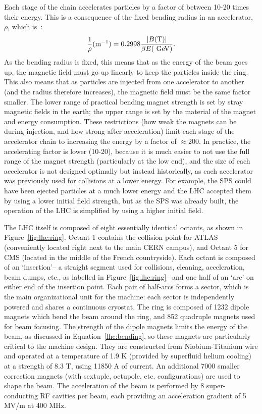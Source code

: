 Each stage of the chain accelerates particles by a factor of between 10-20 times their energy. This is a consequence of the fixed bending radius in an accelerator, $\rho$, which is~\cite{accelerator-book}:
%
\begin{equation}
\label{lhc:bending}
\frac{1}{\rho} (\mathrm{m}^{-1}) = 0.2998 \frac{|B (\mathrm{T})|}{\beta E (\GeV)}.
\end{equation}
%
As the bending radius is fixed, this means that as the energy of the beam goes up, the magnetic field must go up linearly to keep the particles inside the ring. This also means that as particles are injected from one accelerator to another (and the radius therefore increases), the magnetic field must be the same factor smaller. The lower range of practical bending magnet strength is set by stray magnetic fields in the earth; the upper range is set by the material of the magnet and energy consumption. These restrictions (how weak the magnets can be during injection, and how strong after acceleration) limit each stage of the accelerator chain to increasing the energy by a factor of $\approx$200. In practice, the accelerating factor is lower (10-20), because it is much easier to not use the full range of the magnet strength (particularly at the low end), and the size of each accelerator is not designed optimally but instead historically, as each accelerator was previously used for collisions at a lower energy. For example, the SPS could have been ejected particles at a much lower energy and the LHC accepted them by using a lower initial field strength, but as the SPS was already built, the operation of the LHC is simplified by using a higher initial field. 


The LHC itself is composed of eight essentially identical octants, as shown in Figure~\ref{fig:lhc:ring}. Octant 1 contains the collision point for ATLAS (conveniently located right next to the main CERN campus), and Octant 5 for CMS (located in the middle of the French countryside). Each octant is composed of an `insertion'-- a straight segment used for collisions, cleaning, acceleration, beam dumps, etc., as labelled in Figure~\ref{fig:lhc:ring}-- and one half of an `arc' on either end of the insertion point. Each pair of half-arcs forms a sector, which is the main organizational unit for the machine: each sector is independently powered and shares a continuous cryostat. The ring is composed of 1232 dipole magnets which bend the beam around the ring, and 852 quadruple magnets used for beam focusing. The strength of the dipole magnets limits the energy of the beam, as discussed in Equation~\ref{lhc:bending}, so these magnets are particularly critical to the machine design. They are constructed from Niobium-Titanium wire and operated at a temperature of 1.9 K (provided by superfluid helium cooling) at a strength of 8.3 T, using 11850 A of current. An additional 7000 smaller correction magnets (with sextuple, octupole, etc. configurations) are used to shape the beam. The acceleration of the beam is performed by 8 super-conducting RF cavities per beam, each providing an acceleration gradient of 5 MV/m at 400 MHz. 

